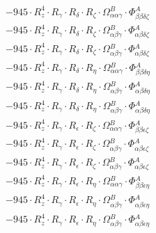 \documentclass{article}
\begin{document}
\begin{subequations}
\begin{gather}
\begin{array}{c}
 \\[0.2em] 		 - 945 \cdot R_{z}^{4} \cdot R_{\gamma{}} \cdot R_{\delta{}} \cdot R_{\zeta{}} \cdot \Omega{}^{B}_{\alpha{}\alpha{}\gamma{}} \cdot \Phi{}^{A}_{\beta{}\beta{}\delta{}\zeta{}} 
 \\[0.2em] 		 - 945 \cdot R_{z}^{4} \cdot R_{\gamma{}} \cdot R_{\delta{}} \cdot R_{\zeta{}} \cdot \Omega{}^{B}_{\alpha{}\beta{}\gamma{}} \cdot \Phi{}^{A}_{\alpha{}\beta{}\delta{}\zeta{}} 
 \\[0.2em] 		 - 945 \cdot R_{z}^{4} \cdot R_{\gamma{}} \cdot R_{\delta{}} \cdot R_{\zeta{}} \cdot \Omega{}^{B}_{\alpha{}\beta{}\gamma{}} \cdot \Phi{}^{A}_{\alpha{}\beta{}\delta{}\zeta{}} 
 \\[0.2em] 		 - 945 \cdot R_{z}^{4} \cdot R_{\gamma{}} \cdot R_{\delta{}} \cdot R_{\eta{}} \cdot \Omega{}^{B}_{\alpha{}\alpha{}\gamma{}} \cdot \Phi{}^{A}_{\beta{}\beta{}\delta{}\eta{}} 
 \\[0.2em] 		 - 945 \cdot R_{z}^{4} \cdot R_{\gamma{}} \cdot R_{\delta{}} \cdot R_{\eta{}} \cdot \Omega{}^{B}_{\alpha{}\beta{}\gamma{}} \cdot \Phi{}^{A}_{\alpha{}\beta{}\delta{}\eta{}} 
 \\[0.2em] 		 - 945 \cdot R_{z}^{4} \cdot R_{\gamma{}} \cdot R_{\delta{}} \cdot R_{\eta{}} \cdot \Omega{}^{B}_{\alpha{}\beta{}\gamma{}} \cdot \Phi{}^{A}_{\alpha{}\beta{}\delta{}\eta{}} 
 \\[0.2em] 		 - 945 \cdot R_{z}^{4} \cdot R_{\gamma{}} \cdot R_{\epsilon{}} \cdot R_{\zeta{}} \cdot \Omega{}^{B}_{\alpha{}\alpha{}\gamma{}} \cdot \Phi{}^{A}_{\beta{}\beta{}\epsilon{}\zeta{}} 
 \\[0.2em] 		 - 945 \cdot R_{z}^{4} \cdot R_{\gamma{}} \cdot R_{\epsilon{}} \cdot R_{\zeta{}} \cdot \Omega{}^{B}_{\alpha{}\beta{}\gamma{}} \cdot \Phi{}^{A}_{\alpha{}\beta{}\epsilon{}\zeta{}} 
 \\[0.2em] 		 - 945 \cdot R_{z}^{4} \cdot R_{\gamma{}} \cdot R_{\epsilon{}} \cdot R_{\zeta{}} \cdot \Omega{}^{B}_{\alpha{}\beta{}\gamma{}} \cdot \Phi{}^{A}_{\alpha{}\beta{}\epsilon{}\zeta{}} 
 \\[0.2em] 		 - 945 \cdot R_{z}^{4} \cdot R_{\gamma{}} \cdot R_{\epsilon{}} \cdot R_{\eta{}} \cdot \Omega{}^{B}_{\alpha{}\alpha{}\gamma{}} \cdot \Phi{}^{A}_{\beta{}\beta{}\epsilon{}\eta{}} 
 \\[0.2em] 		 - 945 \cdot R_{z}^{4} \cdot R_{\gamma{}} \cdot R_{\epsilon{}} \cdot R_{\eta{}} \cdot \Omega{}^{B}_{\alpha{}\beta{}\gamma{}} \cdot \Phi{}^{A}_{\alpha{}\beta{}\epsilon{}\eta{}} 
 \\[0.2em] 		 - 945 \cdot R_{z}^{4} \cdot R_{\gamma{}} \cdot R_{\epsilon{}} \cdot R_{\eta{}} \cdot \Omega{}^{B}_{\alpha{}\beta{}\gamma{}} \cdot \Phi{}^{A}_{\alpha{}\beta{}\epsilon{}\eta{}} 

\end{array}
\end{gather}
\end{subequations}
\end{document}
